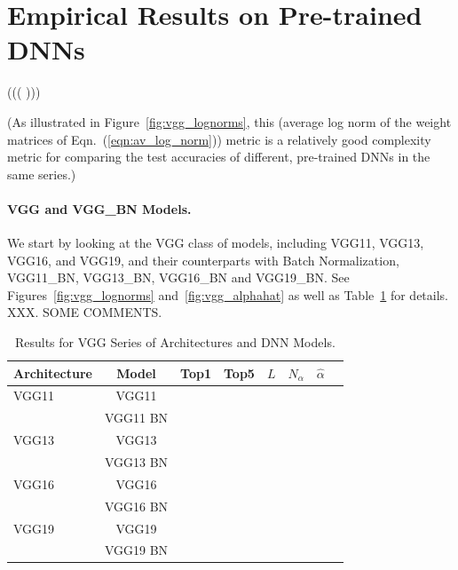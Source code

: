 
\section{Empirical Results on Pre-trained DNNs}
\label{sxn:emp}


(((
)))

(As illustrated in Figure~\ref{fig:vgg_lognorms}, this 
(average log norm of the weight matrices of Eqn.~(\ref{eqn:av_log_norm}))
metric is a relatively good complexity metric for comparing the test accuracies of different, pre-trained DNNs in the same series.)


\paragraph{VGG and VGG\_BN Models.}

We start by looking at the VGG class of models, including VGG11, VGG13, VGG16, and VGG19, and their counterparts with Batch Normalization, VGG11\_BN, VGG13\_BN, VGG16\_BN and VGG19\_BN.  
See Figures~\ref{fig:vgg_lognorms} and~\ref{fig:vgg_alphahat} as well as Table~\ref{table:models_VGG} for details.
XXX.  SOME COMMENTS.

\begin{table}[t]
\small
\begin{center}
\begin{tabular}{|p{1in}|c|c|c|c|c|c|c|}
\hline
Architecture 
 & Model &Top1 
 & Top5 & $L$ & $N_{\alpha}$ & $\hat{\alpha}$ \\
\hline
VGG11 & VGG11 & & & & & \\
  & VGG11 BN & & & & & \\
\hline
VGG13 & VGG13 & & & & & \\
  & VGG13 BN & & & & & \\
\hline
VGG16 & VGG16 & & & & & \\
  & VGG16 BN & & & & & \\
\hline
VGG19 & VGG19 & & & & & \\
  & VGG19 BN & & & & & \\
\hline
\end{tabular}
\end{center}
\caption{Results for VGG Series of Architectures and DNN Models.}
\label{table:models_VGG}
\end{table}


